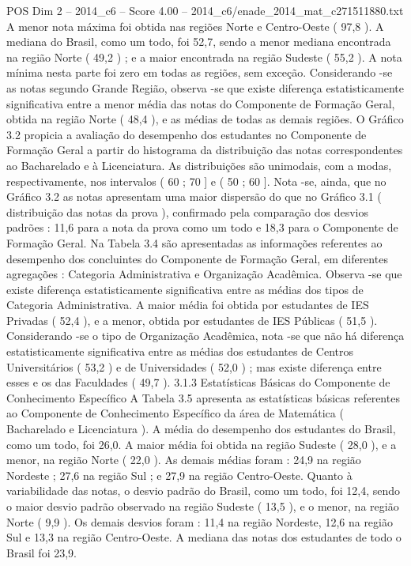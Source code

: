 \begin{textsample}{POS Dim 2 – 2014\_c6 – Score 4.00 – 2014\_c6/enade\_2014\_mat\_c271511880.txt}
A menor nota máxima foi obtida nas regiões Norte e Centro-Oeste ( 97,8 ).
A mediana do Brasil, como um todo, foi 52,7, sendo a menor mediana encontrada na região Norte ( 49,2 ) ; e a maior encontrada na região Sudeste ( 55,2 ).
A nota mínima nesta parte foi zero em todas as regiões, sem exceção.
Considerando -se as notas segundo Grande Região, observa -se que existe diferença estatisticamente significativa entre a menor média das notas do Componente de Formação Geral, obtida na região Norte ( 48,4 ), e as médias de todas as demais regiões.
O Gráfico 3.2 propicia a avaliação do desempenho dos estudantes no Componente de Formação Geral a partir do histograma da distribuição das notas correspondentes ao Bacharelado e à Licenciatura.
As distribuições são unimodais, com a modas, respectivamente, nos intervalos ( 60 ; 70 ] e ( 50 ; 60 ].
Nota -se, ainda, que no Gráfico 3.2 as notas apresentam uma maior dispersão do que no Gráfico 3.1 ( distribuição das notas da prova ), confirmado pela comparação dos desvios padrões : 11,6 para a nota da prova como um todo e 18,3 para o Componente de Formação Geral.
Na Tabela 3.4 são apresentadas as informações referentes ao desempenho dos concluintes do Componente de Formação Geral, em diferentes agregações : Categoria Administrativa e Organização Acadêmica.
Observa -se que existe diferença estatisticamente significativa entre as médias dos tipos de Categoria Administrativa.
A maior média foi obtida por estudantes de IES Privadas ( 52,4 ), e a menor, obtida por estudantes de IES Públicas ( 51,5 ).
Considerando -se o tipo de Organização Acadêmica, nota -se que não há diferença estatisticamente significativa entre as médias dos estudantes de Centros Universitários ( 53,2 ) e de Universidades ( 52,0 ) ; mas existe diferença entre esses e os das Faculdades ( 49,7 ). 3.1.3 Estatísticas Básicas do Componente de Conhecimento Específico A Tabela 3.5 apresenta as estatísticas básicas referentes ao Componente de Conhecimento Específico da área de Matemática ( Bacharelado e Licenciatura ).
A média do desempenho dos estudantes do Brasil, como um todo, foi 26,0.
A maior média foi obtida na região Sudeste ( 28,0 ), e a menor, na região Norte ( 22,0 ).
As demais médias foram : 24,9 na região Nordeste ; 27,6 na região Sul ; e 27,9 na região Centro-Oeste.
Quanto à variabilidade das notas, o desvio padrão do Brasil, como um todo, foi 12,4, sendo o maior desvio padrão observado na região Sudeste ( 13,5 ), e o menor, na região Norte ( 9,9 ).
Os demais desvios foram : 11,4 na região Nordeste, 12,6 na região Sul e 13,3 na região Centro-Oeste.
A mediana das notas dos estudantes de todo o Brasil foi 23,9.

\end{textsample}

